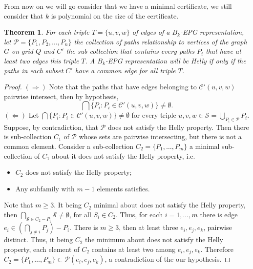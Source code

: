 \documentclass[a4paper,11pt]{article}
\newtheorem{theorem}{Theorem}
\begin{document}
From now on we will go consider that we have a minimal certificate, we still consider that $k$ is polynomial on the size of the certificate. 

\begin{theorem}
For each triple $T=\{u,v,w\}$ of edges of a $B_k$-EPG representation, let $\mathcal{P}=\{P_1, P_2, \dots, P_n\}$ the collection of paths relationship to vertices of the graph $G$ on grid $Q$ and $C'$ the sub-collection that contains every paths $P_i$ that have at least two edges this triple $T$. A $B_k$-EPG representation will be Helly if only if the paths in each subset $C'$ have a common edge for all triple $T$. 
\end{theorem}

\begin{proof}
$(\Rightarrow)$ Note that the paths that have edges belonging to $\mathcal{C'}(u, v, w)$ pairwise intersect, then by hypothesis,
$$\bigcap \{P_i: P_i	\in \mathcal{C'}(u,v,w)\} \neq \emptyset .$$
$(\Leftarrow)$ Let $\bigcap \{P_i: P_i	\in \mathcal{C'}(u,v,w)\} \neq \emptyset$  for every triple $ \displaystyle  u,v,w \in \mathcal{S} = \bigcup _{P_i \in \mathcal{P}} P_i$.
Suppose, by contradiction, that $\mathcal{P}$ does not satisfy the Helly property. Then there is sub-collection $C_1$ of $ \mathcal{P}$ whose sets are pairwise intersecting, but there is not a common element. Consider a sub-collection $C_2 = \{P_1, \dots, P_m\}$ a minimal sub-collection of $C_1$ about  it does not satisfy the Helly property, i.e.
\begin{itemize}
\item $C_2$ does not satisfy the Helly property;
\item Any subfamily with $m-1$ elements satisfies.
\end{itemize}
Note that $m\geq 3$. It being $C_2$ minimal about does not satisfy the Helly property, then $\bigcap _{ \mathcal{S} \in C_2-P_i	} \mathcal{S} \neq \emptyset$, for all $S_i \in C_2$. Thus,  for each $i=1, \dots, m$ there is edge $e_i \in (\bigcap _{j\neq i}P_j)-P_i$.
There is $m\geq 3$, then at least three $e_i, e_j, e_k$, pairwise distinct. Thus, it being $C_2$ the minimum about does not satisfy the Helly property, each element of $C_2$ contains at least two among $e_i, e_j, e_k$.  Therefore $C_2 = \{P_1, \dots, P_m\} \subset \mathcal{P}(e_i, e_j, e_k)$, a contradiction of the our hypothesis.
\end{proof}
\end{document}
